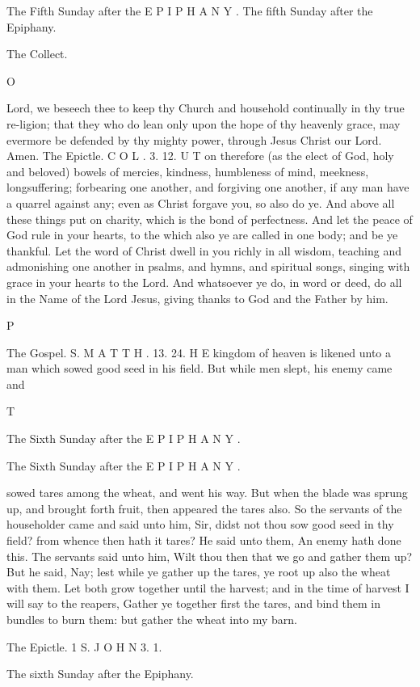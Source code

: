 The Fifth Sunday after the E P I P H A N Y . The fifth Sunday after the Epiphany.

The Collect.

O

Lord, we beseech thee to keep thy Church and household continually in thy true re-ligion; that they who do lean only upon the hope of thy heavenly grace, may evermore be defended by thy mighty power, through Jesus Christ our Lord. Amen. The Epictle. C O L . 3. 12. U T on therefore (as the elect of God, holy and beloved) bowels of mercies, kindness, humbleness of mind, meekness, longsuffering; forbearing one another, and forgiving one another, if any man have a quarrel against any; even as Christ forgave you, so also do ye. And above all these things put on charity, which is the bond of perfectness. And let the peace of God rule in your hearts, to the which also ye are called in one body; and be ye thankful. Let the word of Christ dwell in you richly in all wisdom, teaching and admonishing one another in psalms, and hymns, and spiritual songs, singing with grace in your hearts to the Lord. And whatsoever ye do, in word or deed, do all in the Name of the Lord Jesus, giving thanks to God and the Father by him.

P

The Gospel. S. M A T T H . 13. 24. H E kingdom of heaven is likened unto a man which sowed good seed in his field. But while men slept, his enemy came and

T

The Sixth Sunday after the E P I P H A N Y .

The Sixth Sunday after the E P I P H A N Y .

sowed tares among the wheat, and went his way. But when the blade was sprung up, and brought forth fruit, then appeared the tares also. So the servants of the householder came and said unto him, Sir, didst not thou sow good seed in thy field? from whence then hath it tares? He said unto them, An enemy hath done this. The servants said unto him, Wilt thou then that we go and gather them up? But he said, Nay; lest while ye gather up the tares, ye root up also the wheat with them. Let both grow together until the harvest; and in the time of harvest I will say to the reapers, Gather ye together first the tares, and bind them in bundles to burn them: but gather the wheat into my barn.

The Epictle. 1 S. J O H N 3. 1.

The sixth Sunday after the Epiphany.

